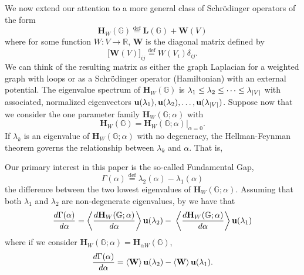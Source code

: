     We now extend our attention to a more general class of Schr\"{o}dinger operators of the form
    \begin{equation}
      \mathbf{H}_W(\mathbb{G}) \stackrel{\text{def}}{=} \mathbf{L}(\mathbb{G}) + \mathbf{W}(V) \label{eqn:hw}
    \end{equation}
    where for some function $W:V\rightarrow\mathbb{R}$, $\mathbf{W}$ is the diagonal matrix defined by
    \begin{equation}
      \big[\mathbf{W}(V)\big]_{ij} \stackrel{\text{def}}{=} W(V_i) \delta_{ij}.
    \end{equation}
    We can think of the resulting matrix as either the graph Laplacian for a weighted graph with loops or as a Schr\"{o}dinger operator (Hamiltonian) with an external potential. The eigenvalue spectrum of $\mathbf{H}_W(\mathbb{G})$ is $\lambda_1 \leq \lambda_2 \leq \dots \leq \lambda_{\left\lvert V \right\rvert}$ with associated, normalized eigenvectors $\mathbf{u}(\lambda_1),\mathbf{u}(\lambda_2),\dots,\mathbf{u}(\lambda_{\left\lvert V \right\rvert})$. Suppose now that we consider the one parameter family $\mathbf{H}_W(\mathbb{G};\alpha)$ with
    \begin{equation}
      \mathbf{H}_W(\mathbb{G}) = \mathbf{H}_W(\mathbb{G};\alpha) \Big\rvert_{\alpha=0}.
    \end{equation}
    If $\lambda_k$ is an eigenvalue of $\mathbf{H}_W(\mathbb{G};\alpha)$ with no degeneracy, the Hellman-Feynman theorem governs the relationship between $\lambda_k$ and $\alpha$. That is,
    \HellmanFeynman*

    Our primary interest in this paper is the so-called Fundamental Gap,
    \begin{equation}
      \Gamma(\alpha) \stackrel{\text{def}}{=} \lambda_2(\alpha) - \lambda_1(\alpha)
    \end{equation}
    the difference between the two lowest eigenvalues of $\mathbf{H}_W(\mathbb{G};\alpha)$. Assuming that both $\lambda_1$ and $\lambda_2$ are non-degenerate eigenvalues, by  we have that
    \begin{equation}\label{eqn:Hellman-Feynman}
      \frac{d \Gamma(\alpha)}{d \alpha} = \left \langle \frac{d \mathbf{H}_W(\mathbb{G};\alpha)}{d \alpha} \right \rangle{\mathbf{u}(\lambda_2)} - \; \left \langle \frac{d \mathbf{H}_W(\mathbb{G};\alpha)}{d \alpha} \right \rangle{\mathbf{u}(\lambda_1)}
    \end{equation}
    where if we consider $\mathbf{H}_W(\mathbb{G};\alpha) = \mathbf{H}_{\alpha W}(\mathbb{G})$,
    \begin{equation}
      \frac{d \Gamma(\alpha)}{d \alpha} = \left \langle \mathbf{W} \right \rangle{\mathbf{u}(\lambda_2)} - \left \langle \mathbf{W} \right \rangle{\mathbf{u}(\lambda_1)}.
    \end{equation}

